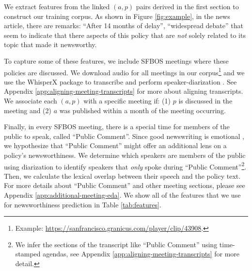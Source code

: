 \documentclass[11pt]{article}
\begin{document}
We extract features from the linked $(a, p)$ pairs derived in the first section to construct our training corpus. As shown in Figure \ref{fig:example}, in the news article, there are remarks: ``After 14 months of delay'', ``widespread debate'' that seem to indicate that there aspects of this policy that are \textit{not} solely related to its topic that made it newsworthy.%

To capture some of these features, we include SFBOS meetings where these policies are discussed. We download audio for all meetings in our corpus\footnote{Example: \url{https://sanfrancisco.granicus.com/player/clip/43908}.} and we use the WhisperX package \cite{bain2022whisperx} to transcribe and perform speaker-diarization%
. See Appendix \ref{app:aligning-meeting-transcripts} for more about aligning transcripts. We associate each $(a,p)$ with a specific meeting if: (1) $p$ is discussed in the meeting and (2) $a$ was published within a month of the meeting occurring.

Finally, in every SFBOS meeting, there is a special time for members of the public to speak, called ``Public Comment''. Since good newswriting is emotional \cite{uribe2007aresensational}, we hypothesize that ``Public Comment'' might offer an additional lens on a policy's newsworthiness. We determine which speakers are members of the public using diarization to identify speakers that \textit{only} spoke during ``Public Comment''\footnote{We infer the sections of the transcript like ``Public Comment'' using time-stamped agendas, see Appendix \ref{app:aligning-meeting-transcripts} for more detail.}. Then, we calculate the lexical overlap between their speech and the policy text. For more details about ``Public Comment'' and other meeting sections, please see Appendix \ref{app:additional-meeting-eda}. We show all of the features that we use for newsworthiness prediction in Table \ref{tab:features}.



\end{document}
